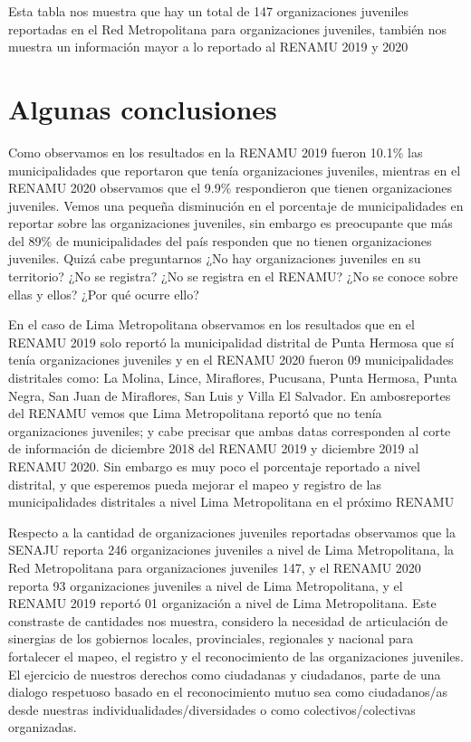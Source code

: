 \documentclass[
]{book}
\begin{document}
Esta tabla nos muestra que hay un total de 147 organizaciones juveniles reportadas en el Red Metropolitana para organizaciones juveniles, también nos muestra un información mayor a lo reportado al RENAMU 2019 y 2020

\hypertarget{algunas-conclusiones}{%
\section{Algunas conclusiones}\label{algunas-conclusiones}}

Como observamos en los resultados en la RENAMU 2019 fueron 10.1\% las municipalidades que reportaron que tenía organizaciones juveniles, mientras en el RENAMU 2020 observamos que el 9.9\% respondieron que tienen organizaciones juveniles. Vemos una pequeña disminución en el porcentaje de municipalidades en reportar sobre las organizaciones juveniles, sin embargo es preocupante que más del 89\% de municipalidades del país responden que no tienen organizaciones juveniles. Quizá cabe preguntarnos ¿No hay organizaciones juveniles en su territorio? ¿No se registra? ¿No se registra en el RENAMU? ¿No se conoce sobre ellas y ellos? ¿Por qué ocurre ello?

En el caso de Lima Metropolitana observamos en los resultados que en el RENAMU 2019 solo reportó la municipalidad distrital de Punta Hermosa que sí tenía organizaciones juveniles y en el RENAMU 2020 fueron 09 municipalidades distritales como: La Molina, Lince, Miraflores, Pucusana, Punta Hermosa, Punta Negra, San Juan de Miraflores, San Luis y Villa El Salvador. En ambosreportes del RENAMU vemos que Lima Metropolitana reportó que no tenía organizaciones juveniles; y cabe precisar que ambas datas corresponden al corte de información de diciembre 2018 del RENAMU 2019 y diciembre 2019 al RENAMU 2020. Sin embargo es muy poco el porcentaje reportado a nivel distrital, y que esperemos pueda mejorar el mapeo y registro de las municipalidades distritales a nivel Lima Metropolitana en el próximo RENAMU

Respecto a la cantidad de organizaciones juveniles reportadas observamos que la SENAJU reporta 246 organizaciones juveniles a nivel de Lima Metropolitana, la Red Metropolitana para organizaciones juveniles 147, y el RENAMU 2020 reporta 93 organizaciones juveniles a nivel de Lima Metropolitana, y el RENAMU 2019 reportó 01 organización a nivel de Lima Metropolitana. Este constraste de cantidades nos muestra, considero la necesidad de articulación de sinergias de los gobiernos locales, provinciales, regionales y nacional para fortalecer el mapeo, el registro y el reconocimiento de las organizaciones juveniles. El ejercicio de nuestros derechos como ciudadanas y ciudadanos, parte de una dialogo respetuoso basado en el reconocimiento mutuo sea como ciudadanos/as desde nuestras individualidades/diversidades o como colectivos/colectivas organizadas.
\end{document}
